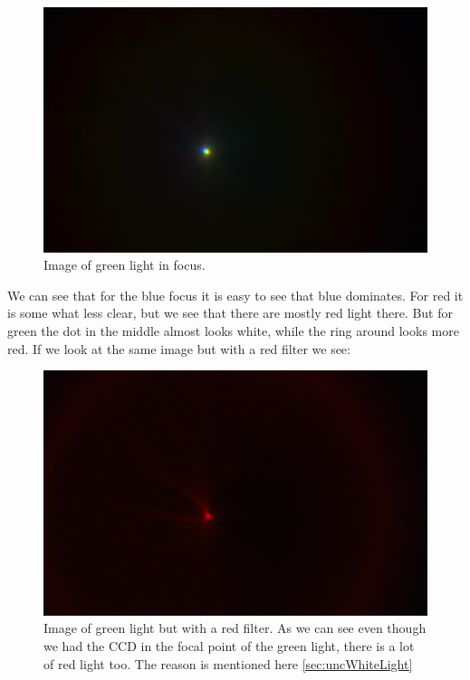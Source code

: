 \documentclass{emulateapj}
\begin{document}
\begin{figure}[H]
\centering
\includegraphics[scale=0.2]{gront_fokus.png}
\caption{Image of green light in focus.}
\label{img:green}
\end{figure}

We can see that for the blue focus it is easy to see that blue dominates. For red it is some what less clear, but we see that there are mostly red light there. But for green the dot in the middle almost looks white, while the ring around looks more red. If we look at the same image but with a red filter we see:

\begin{figure}[H]
\centering
\includegraphics[scale=0.2]{red_filter_green_focus.png}
\caption{Image of green light but with a red filter. As we can see even though we had the CCD in the focal point of the green light, there is a lot of red light too. The reason is mentioned here \ref{sec:uncWhiteLight}}
\label{img:red_filter_green_focus}
\end{figure}
\end{document}
